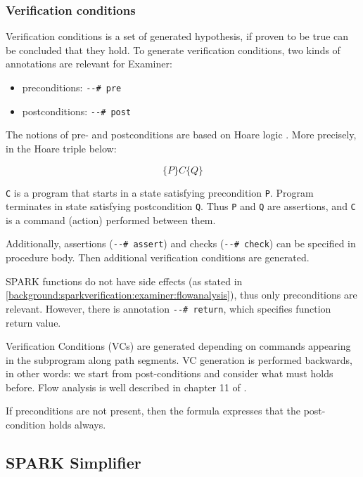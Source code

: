 \subsubsection{Verification conditions}
\label{background:sparkverification:examiner:vc}

Verification conditions is a set of generated hypothesis, if proven to be true can be concluded that they hold. To generate verification conditions, two kinds of annotations are relevant for Examiner:
\begin{itemize}
	\item preconditions: \lstinline{--# pre}
	\item postconditions: \lstinline{--# post}
\end{itemize}

The notions of pre- and postconditions are based on Hoare logic \cite{HoareLogic:Paper}. More precisely, in the Hoare triple below: 

\begin{equation} \label{eq:hoare_triple}
	\{P\} C \{Q\}
\end{equation}

\lstinline{C} is a program that starts in a state satisfying precondition \lstinline{P}. Program terminates in state satisfying postcondition \lstinline{Q}. Thus \lstinline{P} and \lstinline{Q} are assertions, and \lstinline{C} is a command (action) performed between them.

Additionally, assertions (\lstinline{--# assert}) and checks (\lstinline{--# check}) can be specified in procedure body. Then additional verification conditions are generated.

SPARK functions do not have side effects (as stated in \ref{background:sparkverification:examiner:flowanalysis}), thus only preconditions are relevant. However, there is annotation \lstinline{--# return}, which specifies function return value.

Verification Conditions (VCs) are generated depending on commands appearing in the subprogram along path segments. VC generation is performed backwards, in other words: we start from post-conditions and consider what must holds before. Flow analysis is well described in chapter 11 of \cite{Barnes:Book}.

If preconditions are not present, then the formula expresses that the post-condition holds always.



\subsection{SPARK Simplifier}
\label{background:sparkverification:simplifier}

